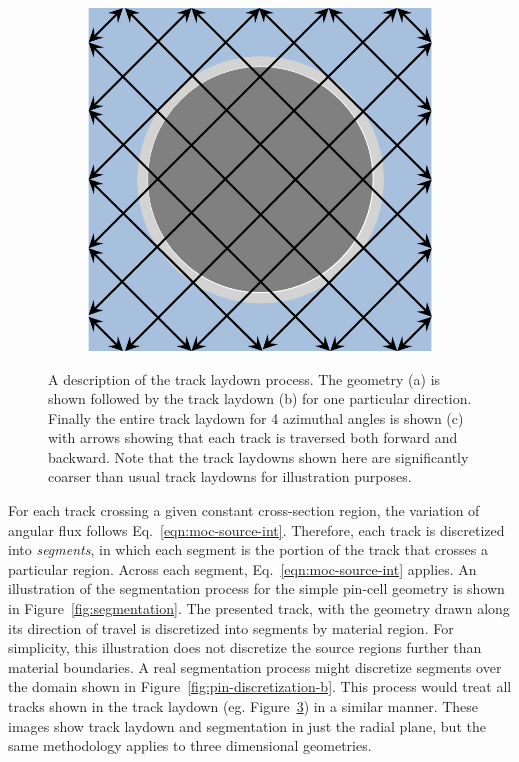 \begin{figure}[h!]
\begin{subfigure}{0.3\textwidth}
		\caption{}
		\label{fig:track-laydown-b}
	\end{subfigure}
	\begin{subfigure}{0.3\textwidth}
		\centering
		\includegraphics[width=\linewidth]{figures/pin_3.PNG}
		\caption{}
		\label{fig:track-laydown-c}
	\end{subfigure}
	\caption[]{A description of the track laydown process. The geometry (a) is shown followed by the track laydown (b) for one particular direction. Finally the entire track laydown for 4 azimuthal angles is shown (c) with arrows showing that each track is traversed both forward and backward. Note that the track laydowns shown here are significantly coarser than usual track laydowns for illustration purposes.}
	\label{fig:track-laydown}
\end{figure}

For each track crossing a given constant cross-section region, the variation of angular flux follows Eq.~\ref{eqn:moc-source-int}. Therefore, each track is discretized into \textit{segments}, in which each segment is the portion of the track that crosses a particular region. Across each segment, Eq.~\ref{eqn:moc-source-int} applies. An illustration of the segmentation process for the simple pin-cell geometry is shown in Figure~\ref{fig:segmentation}. The presented track, with the geometry drawn along its direction of travel is discretized into segments by material region. For simplicity, this illustration does not discretize the source regions further than material boundaries. A real segmentation process might discretize segments over the domain shown in Figure~\ref{fig:pin-discretization-b}. This process would treat all tracks shown in the track laydown (eg. Figure~\ref{fig:track-laydown}) in a similar manner. These images show track laydown and segmentation in just the radial plane, but the same methodology applies to three dimensional geometries.

